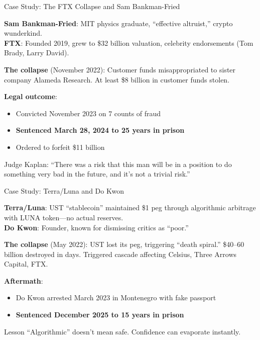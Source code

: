 ﻿\documentclass[aspectratio=169,11pt]{beamer}
\begin{document}
\begin{frame}{Case Study: The FTX Collapse and Sam Bankman-Fried}
\begin{casestudybox}
\textbf{Sam Bankman-Fried}: MIT physics graduate, ``effective altruist,'' crypto wunderkind.\\
\textbf{FTX}: Founded 2019, grew to \$32 billion valuation, celebrity endorsements (Tom Brady, Larry David).
\end{casestudybox}

\vspace{0.3em}
\textbf{The collapse} (November 2022): Customer funds misappropriated to sister company Alameda Research. At least \$8 billion in customer funds stolen.

\textbf{Legal outcome}:
\begin{itemize}
    \item Convicted November 2023 on 7 counts of fraud
    \item \textbf{Sentenced March 28, 2024 to 25 years in prison}
    \item Ordered to forfeit \$11 billion
\end{itemize}

Judge Kaplan: ``There was a risk that this man will be in a position to do something very bad in the future, and it's not a trivial risk.''
\end{frame}

\begin{frame}{Case Study: Terra/Luna and Do Kwon}
\begin{casestudybox}
\small
\textbf{Terra/Luna}: UST ``stablecoin'' maintained \$1 peg through algorithmic arbitrage with LUNA token---no actual reserves.\\
\textbf{Do Kwon}: Founder, known for dismissing critics as ``poor.''
\end{casestudybox}

\vspace{0.2em}
{\small \textbf{The collapse} (May 2022): UST lost its peg, triggering ``death spiral.'' \$40--60 billion destroyed in days. Triggered cascade affecting Celsius, Three Arrows Capital, FTX.}

\textbf{Aftermath}:
\begin{itemize}
    \item Do Kwon arrested March 2023 in Montenegro with fake passport
    \item \textbf{Sentenced December 2025 to 15 years in prison}
\end{itemize}

\begin{alertblock}{Lesson}
``Algorithmic'' doesn't mean safe. Confidence can evaporate instantly.
\end{alertblock}
\end{frame}
\end{document}
